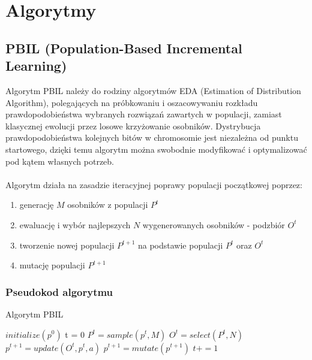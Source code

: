 \documentclass[11pt]{article}
\begin{document}
\pagebreak
\section{Algorytmy}
\subsection{PBIL (Population-Based Incremental Learning)}
\label{sec:org5c31017}
Algorytm PBIL należy do rodziny algorytmów EDA (Estimation of Distribution Algorithm), polegających na próbkowaniu i oszacowywaniu rozkładu prawdopodobieństwa wybranych rozwiązań zawartych w populacji, zamiast klasycznej ewolucji przez losowe krzyżowanie osobników. Dystrybucja prawdopodobieństwa kolejnych bitów w chromosomie jest niezależna od punktu startowego, dzięki temu algorytm można swobodnie modyfikować i optymalizować pod kątem własnych potrzeb.\\\\
Algorytm działa na zasadzie iteracyjnej poprawy populacji początkowej poprzez:
\begin{enumerate}
\item generację $M$ osobników z populacji $P^t$
\item ewaluację i wybór najlepszych $N$ wygenerowanych osobników - podzbiór $O^t$
\item tworzenie nowej populacji $P^{t+1}$ na podstawie populacji $P^t$ oraz $O^t$
\item mutację populacji $P^{t+1}$
\end{enumerate}

\subsubsection{Pseudokod algorytmu}
\begin{algorithm}[h]
\caption{Algorytm PBIL}
\begin{algorithmic}
\State $initialize(p^0)$
\State t = 0
\State $P^t = sample(p^t,M)$
\State $O^t = select(P^t,N)$
\State $p^{t+1} = update(O^t,p^t,a)$
\State $p^{t+1} = mutate(p^{t+1})$
\State $t += 1$
\EndWhile
\end{algorithmic}
\end{algorithm}
\end{document}
